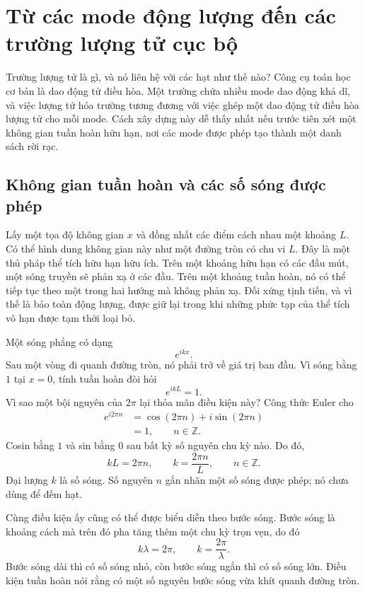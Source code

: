 \chapter{Từ các mode động lượng đến các trường lượng tử cục bộ}

Trường lượng tử là gì, và nó liên hệ với các hạt như thế nào? Công cụ toán học cơ bản là dao động tử điều hòa. Một trường chứa nhiều mode dao động khả dĩ, và việc lượng tử hóa trường tương đương với việc ghép một dao động tử điều hòa lượng tử cho mỗi mode. Cách xây dựng này dễ thấy nhất nếu trước tiên xét một không gian tuần hoàn hữu hạn, nơi các mode được phép tạo thành một danh sách rời rạc.

\section{Không gian tuần hoàn và các số sóng được phép}

Lấy một tọa độ không gian \(x\) và đồng nhất các điểm cách nhau một khoảng \(L\). Có thể hình dung không gian này như một đường tròn có chu vi \(L\). Đây là một thủ pháp thể tích hữu hạn hữu ích. Trên một khoảng hữu hạn có các đầu mút, một sóng truyền sẽ phản xạ ở các đầu. Trên một khoảng tuần hoàn, nó có thể tiếp tục theo một trong hai hướng mà không phản xạ. Đối xứng tịnh tiến, và vì thế là bảo toàn động lượng, được giữ lại trong khi những phức tạp của thể tích vô hạn được tạm thời loại bỏ.

Một sóng phẳng có dạng
\begin{equation}
e^{ikx}.
\end{equation}
Sau một vòng đi quanh đường tròn, nó phải trở về giá trị ban đầu. Vì sóng bằng \(1\) tại \(x=0\), tính tuần hoàn đòi hỏi
\begin{equation}
e^{ikL}=1.
\end{equation}
Vì sao một bội nguyên của \(2\pi\) lại thỏa mãn điều kiện này? Công thức Euler cho
\begin{align}
e^{i2\pi n}
&=\cos(2\pi n)+i\sin(2\pi n)\\
&=1,
\qquad n\in\mathbb Z.
\end{align}
Cosin bằng \(1\) và sin bằng \(0\) sau bất kỳ số nguyên chu kỳ nào. Do đó,
\begin{equation}
kL=2\pi n,
\qquad
k=\frac{2\pi n}{L},
\qquad n\in\mathbb Z.
\end{equation}
Đại lượng \(k\) là số sóng. Số nguyên \(n\) gắn nhãn một số sóng được phép; nó chưa dùng để đếm hạt.

Cùng điều kiện ấy cũng có thể được biểu diễn theo bước sóng. Bước sóng là khoảng cách mà trên đó pha tăng thêm một chu kỳ trọn vẹn, do đó
\begin{equation}
k\lambda=2\pi,
\qquad
k=\frac{2\pi}{\lambda}.
\end{equation}
Bước sóng dài thì có số sóng nhỏ, còn bước sóng ngắn thì có số sóng lớn. Điều kiện tuần hoàn nói rằng có một số nguyên bước sóng vừa khít quanh đường tròn.

